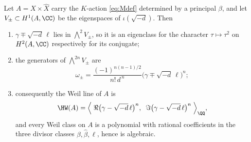 \begin{theorem}\label{thm:splitclosed}
Let $A=X\times\widehat{X}$ carry the $K$-action \eqref{eq:Mdef} determined by a
principal $\beta$, and let $V_{\pm}\subset H^{1}(A,\CC)$ be the eigenspaces of
$\iota(\sqrt{-d})$. Then
\begin{enumerate}[label=\textup{(\roman*)},nosep]
\item $\gamma\mp\sqrt{-d}\,\ell$ lies in $\bigwedge^{2}V_{\pm}$, so it is an
  eigenclass for the character $\tau\mapsto\tau^{2}$ on $H^{2}(A,\CC)$
  respectively for its conjugate;
\item the generators of $\bigwedge^{2n}V_{\pm}$ are
  \begin{equation}\label{eq:splitclosed}
    \omega_{\pm}
    =\frac{(-1)^{n(n-1)/2}}{n!\,d^{\,n}}
      \bigl(\gamma\mp\sqrt{-d}\,\ell\bigr)^{n};
  \end{equation}
\item consequently the Weil line of $A$ is
  \[
    \HW(A)=\Bigl\langle\;
      \Re\bigl(\gamma-\sqrt{-d}\,\ell\bigr)^{n},\;\;
      \Im\bigl(\gamma-\sqrt{-d}\,\ell\bigr)^{n}
    \;\Bigr\rangle_{\QQ},
  \]
  and every Weil class on $A$ is a polynomial with rational coefficients in
  the three divisor classes $\beta,\widehat{\beta},\ell$, hence is algebraic.
\end{enumerate}
\end{theorem}

